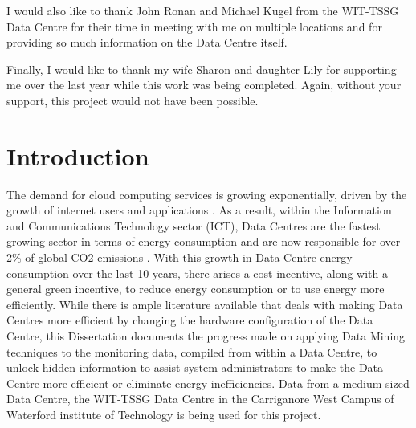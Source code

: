 \documentclass[12pt]{scrartcl}
\begin{document}
I would also like to thank John Ronan and Michael Kugel from the WIT-TSSG Data Centre for their time in meeting with me on multiple locations and for providing so much information on the Data Centre itself. 

Finally, I would like to thank my wife Sharon and daughter Lily for supporting me over the last year while this work was being completed. Again, without your support, this project would not have been possible.  

\newpage
\tableofcontents
\newpage
\listoffigures
\newpage
\newpage
\renewcommand\listoflistingscaption{List of Source Codes}
\listoflistings %
\newpage
{}







\section{Introduction}
\label{sec:[introduction]}
The demand for cloud computing services is growing exponentially, driven by the growth of internet users and applications \citep{edssch.qt9c84f49g20130101}. As a result, within the Information and Communications Technology sector (ICT), Data Centres are the fastest growing sector in terms of energy consumption and are now responsible for over 2\% of global CO2 emissions \citep{edsbas.13818AC20170101}. With this growth in Data Centre energy consumption over the last 10 years, there arises a cost incentive, along with a general green incentive, to reduce energy consumption or to use energy more efficiently. While there is ample literature available that deals with making Data Centres more efficient by changing the hardware configuration of the Data Centre, this Dissertation documents the progress made on applying Data Mining techniques to the monitoring data, compiled from within a Data Centre, to unlock hidden information to assist system administrators to make the Data Centre more efficient or eliminate energy inefficiencies. Data from a medium sized Data Centre, the WIT-TSSG Data Centre in the Carriganore West Campus of Waterford institute of Technology is being used for this project.  
\end{document}
